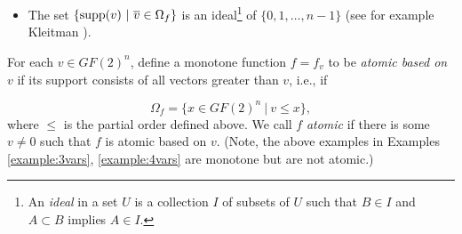 \documentclass[12pt]{article}
\newcommand{\wt}{\mathop{wt}}
\newcommand{\Sum}{\sum\limits}
\begin{document}
\begin{itemize}
\begin{proof}
    To see that $\Omega$ is injective, note that if $f$ and $g$ are
    two different monotone functions, then their supports must differ,
    i.e., $\Omega_f \not= \Omega_g$. To see that $\Omega$ is
    surjective, let $C \subseteq GF(2)^n$ be a given closure in $D_n$
    and define $f_C$ as the function $C$ as a set of support vectors,
    i.e., for all $v \in C$, $f_C(v) = 1$. We claim that $f_C$ is
    monotone.  Let $v, w \in GF(2)^n$ be given where $v \leq w$ and
    $v\not=w$. If $f_C(v) = 0$ then $f_C(v) \leq f_C(w)$, trivially,
    so assume that $f_C(v)=1$. Then, $v \in C$ by definitions. Note
    that if $v \leq w$ and $v\not=w$ then $\wt(v) < \wt(w)$. In
    particular, for some positive integer $k$, $\wt(v) + k = \wt(w)$.
    For $i \in \{0,\ldots,2^n-1\}$, let $e_i$ denote the vector with
    one in component $i$ and zero in all other components. Then there
    is a set $\{i_1,\ldots,i_k\} \subset \{0,\ldots,2^n-1\}$ where $w
    = v+\Sum_{j=1}^k e_j$. For $\ell \in \{0,\ldots,k\}$, let $u_\ell
    = v+ \Sum_{j=1}^\ell e_j$. Then, by the definition of the Hesse
      diagram, for $\ell \in \{0,\ldots,k-1\}$, $(v_\ell,v_{\ell+1})$
      are edges in $D_n$. Then, as $v=v_0 \in C$, by the closure
      property, $v_\ell \in C$ for all $\ell \in \{0,\ldots,k\}$.

  \end{proof}

\item
The set $\{{\rm supp}(v)\ |\ \overline{v}\in\Omega_f\}$ is an
ideal\footnote{
An {\it ideal} in a set $U$ is a collection $I$ of subsets of $U$
such that $B\in I$ and $A\subset B$ implies $A\in I$.
}
of ${\{0,1,\dots,n-1\}}$ (see for example Kleitman \cite{art:k69}).

\end{itemize}

For each $v\in GF(2)^n$,
define a monotone function $f=f_v$ to be
{\it atomic based on $v$} if its support
consists of all vectors greater than $v$,
i.e., if

\[
\Omega_f = \{x\in GF(2)^n \ |\ v\leq x\},
\]
where $\leq$ is the partial order defined above.
We call $f$ {\it atomic} if there is some
$v\not= 0$ such that $f$ is atomic based on $v$.
(Note, the above examples in Examples \ref{example:3vars},
\ref{example:4vars} are monotone but are not atomic.)
\end{document}
